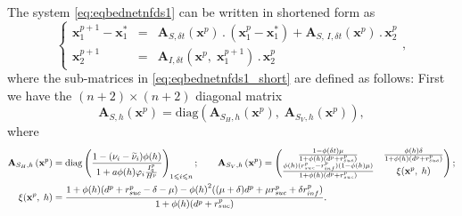 \documentclass[a4paper]{article}
\newcommand{\varphiVar}{r_{inf}}
\newcommand{\varpiVar}{r_{suc}}
\newcommand{\miVar}{\varphi_i}
\begin{document}
{\noindent The system  \eqref{eq:eqbednetnfds1} can be written in shortened form as 
\begin{equation}\label{eq:eqbednetnfds1_short}
\left\{
 \begin{array}{lcr}
 \mathbf x_1^{p+1}-\mathbf x_1^*& = & \mathbf A_{S,\delta t}\left(\mathbf x^{p}\right)\,.\,\left(\mathbf x_1^p - \mathbf x_1^*\right) +\mathbf A_{S,\,I,\delta t}(\mathbf x^p)\,.\,\mathbf x_2^p\\\mathbf x^{p+1}_2 & = & \mathbf A_{I,\delta t} \left(\mathbf x^{p},\;\mathbf x^{p+1}_1\right)\,.\,\mathbf x_2^p
 \end{array}
\right.  ,
\end{equation} 
where the sub-matrices in \eqref{eq:eqbednetnfds1_short} are defined as follows: First we have the $(n+2)\times (n+2)$ diagonal matrix
$$\mathbf A_{S,h}\left(\mathbf x^{p}\right) = \mathrm{diag}\left(\mathbf A_{S_{H},h}\left(\mathbf x^{p} \right) ,\;\mathbf A_{S_{V},h}\left(\mathbf x^{p} \right)\right),$$
where
\begin{align*}
\mathbf A_{S_{H},h}\left(\mathbf x^{p} \right) &= \mathrm{diag}\left(\frac{1-(\nu_i-\widetilde \nu_i)\phi(h)}{1+a\phi(h)\miVar\frac{I^p_q}{H^p}}\right)_{1\leqslant i \leqslant n}; \qquad \mathbf A_{S_{V},h}\left(\mathbf x^{p} \right) =\begin{pmatrix}
\frac{1-\phi(\delta t)\mu}{1+\phi(h)(d^p+\varpiVar ^p)} & \frac{\phi(h)\delta}{1+\phi(h)(d^p+\varpiVar ^p)}\cr \frac{\phi(h)(\varpiVar ^p-\varphiVar ^p)(1-\phi(h)\mu)}{1+\phi(h)(d^p+\varpiVar ^p)} &\xi(\mathbf x^p,\; h) \end{pmatrix};\\ 
\xi(\mathbf x^p,\;h) &=\dfrac{1+ \phi(h)(d^p+\varpiVar ^p-\delta-\mu) -  {\phi(h)}^2((\mu+\delta) d^p+\mu\varpiVar ^{p}+\delta\varphiVar ^p)}{1+\phi(h)(d^p+\varpiVar ^p)}.
\end{align*}

}
\end{document}
